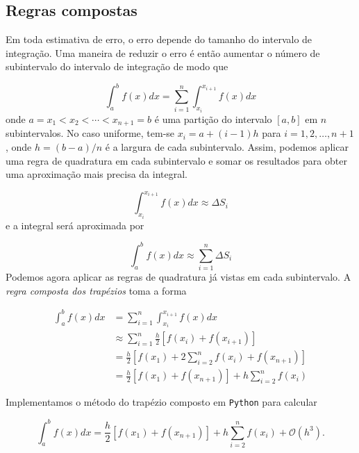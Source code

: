 \documentclass{article}
\begin{document}
\subsection{Regras compostas}

Em toda estimativa de erro, o erro depende do tamanho do intervalo de integração. Uma maneira de reduzir o erro é então aumentar o número de subintervalo do intervalo de integração de modo que

\begin{equation}
    \int_{a}^{b} f(x) dx = \sum_{i=1}^{n} \int_{x_i}^{x_{i+1}} f(x) dx
\end{equation}
onde \(a = x_1 < x_2 < \cdots < x_{n+1} = b\) é uma partição do intervalo \([a, b]\) em \(n\) subintervalos. No caso uniforme, tem-se \(x_i = a + (i-1)h\) para \(i = 1, 2, \ldots, n+1\), onde \(h = (b-a)/n\) é a largura de cada subintervalo. Assim, podemos aplicar uma regra de quadratura em cada subintervalo e somar os resultados para obter uma aproximação mais precisa da integral.

\begin{equation}
    \int_{x_i}^{x_{i+1}} f(x) dx \approx \Delta S_i
\end{equation}
e a integral será aproximada por

\begin{equation}
    \int_{a}^{b} f(x) dx \approx \sum_{i=1}^{n} \Delta S_i
\end{equation}
Podemos agora aplicar as regras de quadratura já vistas em cada subintervalo. A \emph{regra composta dos trapézios} toma a forma

\begin{align}
    \int_{a}^{b} f(x) dx &= \sum_{i=1}^{n} \int_{x_i}^{x_{i+1}} f(x) dx \\
    &\approx \sum_{i=1}^{n} \frac{h}{2} [f(x_i) + f(x_{i+1})] \\
    &= \frac{h}{2} \left[f(x_1) + 2\sum_{i=2}^{n} f(x_i) + f(x_{n+1})\right] \\
    &= \frac{h}{2} \left[f(x_1) + f(x_{n+1})\right] + h \sum_{i=2}^{n} f(x_i)
\end{align}

Implementamos o método do trapézio composto em \texttt{Python} para calcular

\begin{equation}
    \int_{a}^{b} f(x) dx = \frac{h}{2} \left[f(x_1) + f(x_{n+1})\right] + h \sum_{i=2}^{n} f(x_i) + \mathcal{O}(h^3).
\end{equation}
\end{document}
